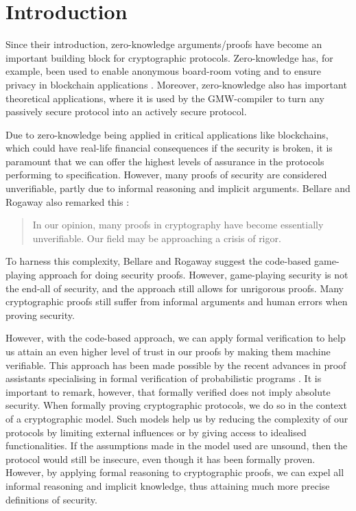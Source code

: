 \chapter{Introduction}
\label{ch:intro}
Since their introduction, zero-knowledge arguments/proofs have become
an important building block for cryptographic protocols.
Zero-knowledge has, for example, been used to enable anonymous board-room
voting \cite{boardroom-voting} and to ensure privacy in blockchain applications \cite{concordium}.
Moreover, zero-knowledge also has important theoretical applications, where it
is used by the GMW-compiler to turn any passively secure protocol into an
actively secure protocol.

Due to zero-knowledge being applied in critical applications like
blockchains, which could have real-life financial consequences if the security is
broken, it is paramount that we can offer the highest levels of assurance in the
protocols performing to specification.
However, many proofs of security are considered unverifiable, partly due to informal
reasoning and implicit arguments. Bellare and Rogaway also remarked this \cite{game-playing}:

\begin{quote}
In our opinion, many proofs in cryptography have become essentially unverifiable. Our field may be approaching a crisis of rigor.
\end{quote}

To harness this complexity, Bellare and Rogaway suggest the code-based game-playing approach
for doing security proofs.
However, game-playing security is not the end-all of security, and the approach
still allows for unrigorous proofs. Many cryptographic proofs still suffer
from informal arguments and human errors when proving security.

However, with the code-based approach, we can apply
formal verification to help us attain an even higher level of trust in our
proofs by making them machine verifiable.
This approach has been made possible by the recent advances in proof assistants
specialising in formal verification of probabilistic programs \cite{SOK:CAC}.
It is important to remark, however, that formally verified does not imply
absolute security. When formally proving cryptographic protocols, we do so in
the context of a cryptographic model.
Such models help us by reducing the complexity of our protocols
by limiting external influences or by giving access to idealised
functionalities. If the assumptions made in the model used are unsound, then the
protocol would still be insecure, even though it has been formally proven.
However, by applying formal
reasoning to cryptographic proofs, we can expel all informal reasoning and
implicit knowledge, thus attaining much more precise definitions of security.

